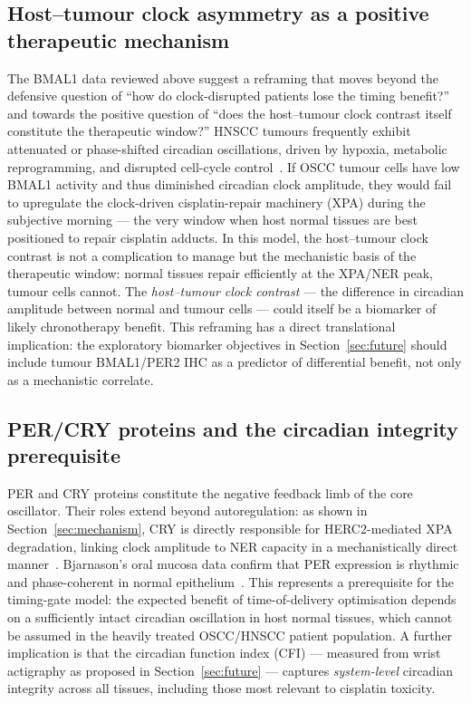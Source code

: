 \documentclass[preprint,review,12pt]{elsarticle}
\begin{document}
\subsection{Host--tumour clock asymmetry as a positive therapeutic mechanism}

The BMAL1 data reviewed above suggest a reframing that moves beyond the
defensive question of ``how do clock-disrupted patients lose the timing
benefit?'' and towards the positive question of ``does the host--tumour
clock contrast itself constitute the therapeutic window?''  HNSCC tumours
frequently exhibit attenuated or phase-shifted circadian oscillations,
driven by hypoxia, metabolic reprogramming, and disrupted cell-cycle
control~\cite{Kramer2022}.  If OSCC tumour cells have low BMAL1 activity
and thus diminished circadian clock amplitude, they would fail to upregulate
the clock-driven cisplatin-repair machinery (XPA) during the subjective
morning --- the very window when host normal tissues are best positioned to
repair cisplatin adducts.  In this model, the host--tumour clock contrast is
not a complication to manage but the mechanistic basis of the therapeutic
window: normal tissues repair efficiently at the XPA/NER peak, tumour cells
cannot.  The \emph{host--tumour clock contrast} --- the difference in
circadian amplitude between normal and tumour cells --- could itself be a
biomarker of likely chronotherapy benefit.  This reframing has a direct
translational implication: the exploratory biomarker objectives in
Section~\ref{sec:future} should include tumour BMAL1/PER2 IHC as a
predictor of differential benefit, not only as a mechanistic correlate.

\subsection{PER/CRY proteins and the circadian integrity prerequisite}

PER and CRY proteins constitute the negative feedback limb of the core
oscillator.  Their roles extend beyond autoregulation: as shown in
Section~\ref{sec:mechanism}, CRY is directly responsible for HERC2-mediated XPA
degradation, linking clock amplitude to NER capacity in a mechanistically
direct manner~\cite{Kang2010}.  Bjarnason's oral mucosa data confirm that PER
expression is rhythmic and phase-coherent in normal epithelium~\cite{Bjarnason2001}.
This represents a prerequisite for the timing-gate model: the expected benefit
of time-of-delivery optimisation depends on a sufficiently intact circadian
oscillation in host normal tissues, which cannot be assumed in the heavily
treated OSCC/HNSCC patient population.  A further implication is that the
circadian function index (CFI) --- measured from wrist actigraphy as
proposed in Section~\ref{sec:future} --- captures \emph{system-level}
circadian integrity across all tissues, including those most relevant to
cisplatin toxicity.
\end{document}
